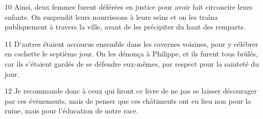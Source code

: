 
10 Ainsi, deux femmes furent déférées en justice pour avoir fait circoncire leurs enfants. On suspendit leurs nourrissons à leurs seins et on les traîna publiquement à travers la ville, avant de les précipiter du haut des remparts.

11 D’autres étaient accourus ensemble dans les cavernes voisines, pour y célébrer en cachette le septième jour. On les dénonça à Philippe, et ils furent tous brûlés, car ils s’étaient gardés de se défendre eux-mêmes, par respect pour la sainteté du jour.

12 Je recommande donc à ceux qui liront ce livre de ne pas se laisser décourager par ces événements, mais de penser que ces châtiments ont eu lieu non pour la ruine, mais pour l’éducation de notre race.